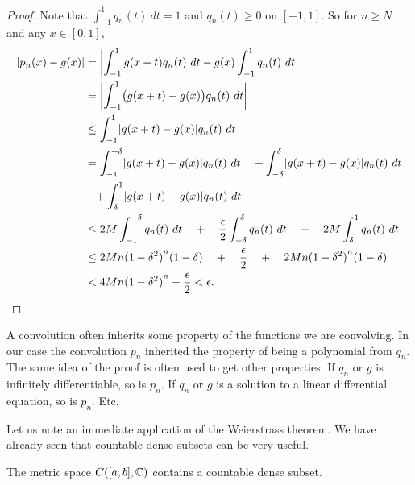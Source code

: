 \begin{proof}
Note that 
$\int_{-1}^1 q_n(t) ~ dt = 1$ and $q_n(t) \geq 0$ on $[-1,1]$.  So for $n
\geq N$ and any $x \in [0,1]$,
\begin{equation*}
\begin{split}
\lvert {p_n(x)-g(x)} \rvert & =
\left\lvert {\int_{-1}^1 g(x+t)q_n(t) ~ dt
-g(x)\int_{-1}^1 q_n(t) ~ dt} \right\rvert \\
& =
\left\lvert {\int_{-1}^1 \bigl(g(x+t)-g(x)\bigr)q_n(t) ~ dt} \right\rvert \\
& \leq
\int_{-1}^1 \lvert {g(x+t)-g(x)} \rvert q_n(t) ~ dt \\
& =
\int_{-1}^{-\delta} \lvert {g(x+t)-g(x)} \rvert q_n(t) ~ dt
\quad +
\int_{-\delta}^{\delta} \lvert {g(x+t)-g(x)} \rvert q_n(t) ~ dt
\\
& \phantom{\leq} +
\int_{\delta}^1 \lvert {g(x+t)-g(x)} \rvert q_n(t) ~ dt \\
& \leq
2M
\int_{-1}^{-\delta} q_n(t) ~ dt
\quad
+
\quad
\frac{\epsilon}{2}
\int_{-\delta}^{\delta} q_n(t) ~ dt
\quad
+
\quad
2M
\int_{\delta}^1 q_n(t) ~ dt \\
& \leq
2M n{(1-\delta^2)}^n(1-\delta)
\quad
+
\quad
\frac{\epsilon}{2}
\quad
+
\quad
2M n{(1-\delta^2)}^n(1-\delta) \\
& <
4M n{(1-\delta^2)}^n
+
\frac{\epsilon}{2}
< \epsilon . \qedhere
\end{split}
\end{equation*}
\end{proof}

A convolution often inherits some property of the functions we are convolving.
In our case the convolution $p_n$ inherited the property of being a
polynomial from $q_n$.  The same idea of the proof is often used 
to get other properties.  If $q_n$ or $g$ is infinitely differentiable, so is $p_n$.
If $q_n$ or $g$ is a solution to a linear differential equation, so is $p_n$.
Etc.

Let us note an immediate application of the Weierstrass theorem.  We have
already seen that countable dense subsets can be very useful.

\begin{cor}
The metric space $C([a,b],{\mathbb{C}})$ contains a countable dense subset.
\end{cor}

